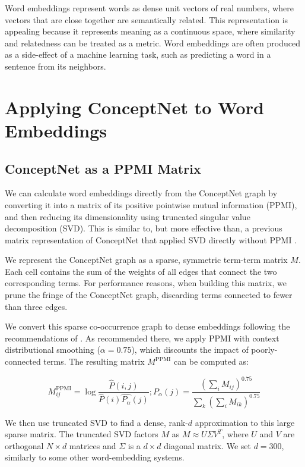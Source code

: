 \documentclass[letterpaper]{article}
\begin{document}
Word embeddings represent words as dense unit vectors of real numbers,
where vectors that are close together are semantically related. This representation
is appealing because it represents meaning as a continuous space, where similarity
and relatedness can be treated as a metric. Word embeddings are often produced as a side-effect
of a machine learning task, such as predicting a word in a sentence from its neighbors.

\section{Applying ConceptNet to Word Embeddings}

\subsection{ConceptNet as a PPMI Matrix}

We can calculate word embeddings directly from the ConceptNet graph by converting
it into a matrix of its positive pointwise mutual information (PPMI), and then
reducing its dimensionality using truncated singular value decomposition (SVD).
This is similar to, but more effective than, a previous matrix representation of
ConceptNet that applied SVD directly without PPMI \cite{speer2008analogyspace}.

We represent the ConceptNet graph as a sparse, symmetric term-term matrix $M$.
Each cell contains the sum of the weights of all edges that connect the two
corresponding terms. For performance reasons, when building this matrix, we
prune the fringe of the ConceptNet graph, discarding terms connected to fewer
than three edges.

We convert this sparse co-occurrence graph to dense embeddings following the
recommendations of  
\citeauthor{levy2015embeddings} . As recommended
there, we apply PPMI with context distributional smoothing ($\alpha=0.75$),
which discounts the impact of poorly-connected terms. The resulting matrix
$M^\text{PPMI}$ can be computed as:

$$
M^\text{PPMI}_{ij} =
\log \frac
  {\hat{P} \left(i, j\right)}
  {\hat{P} \left(i\right) \hat{P_\alpha} \left(j\right)}
;
\hat{P_\alpha} \left(j\right) =
\frac
  {\left(\sum_i{M_{ij}}\right)^{0.75}}
  {\sum_k{\left(\sum_i{M_{ik}}\right)^{0.75}}}
$$

We then use truncated SVD to find a dense, rank-$d$ approximation to
this large sparse matrix. The truncated SVD factors $M$ as $M \approx U \Sigma
V^T$, where $U$ and $V$ are orthogonal $N \times d$ matrices and $\Sigma$ is a
$d \times d$ diagonal matrix. We set $d = 300$, similarly to some other
word-embedding systems.
\end{document}
